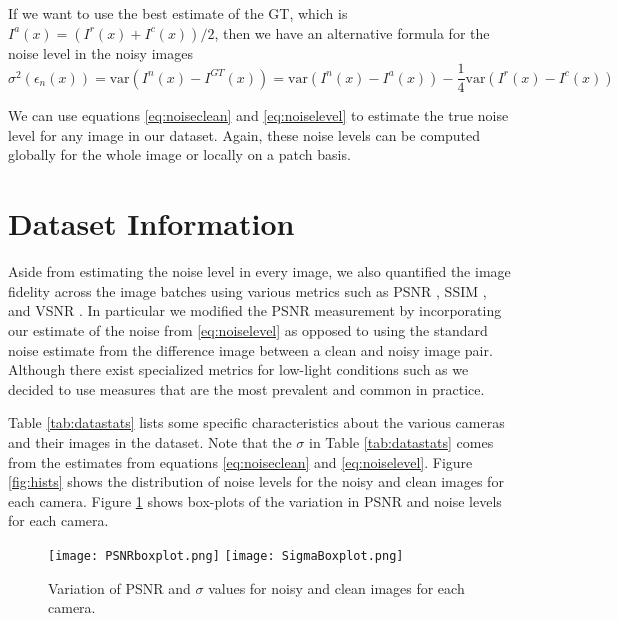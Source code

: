 \documentclass[review]{elsarticle}
\newcommand{\var}{\text{var}}
\begin{document}
If we want to use the best estimate of the GT, which is $I^a(x)=(I^r(x)+I^c(x))/2$, then we have an alternative formula for the noise level in the noisy images
\begin{equation}
\sigma^2(\epsilon_n(x))=\var(I^n(x)-I^{GT}(x))=\var(I^n(x)-I^a(x))-\frac{1}{4}\var(I^r(x)-I^c(x)) \label{eq:noiselevel1}
\end{equation}

We can use equations \eqref{eq:noiseclean} and \eqref{eq:noiselevel} to estimate the true noise level for any image in our dataset. Again, these noise levels can be computed globally for the whole image or locally on a patch basis.





\section{Dataset Information}


Aside from estimating the noise level in every image, we also quantified the image fidelity across the image batches using various metrics such as PSNR \cite{perceptualdistortion}, SSIM \cite{ssim}, and VSNR \cite{vsnr}. In particular we modified the PSNR measurement by incorporating our estimate of the noise from \eqref{eq:noiselevel} as opposed to using the standard noise estimate from the difference image between a clean and noisy image pair.  Although there exist specialized metrics for low-light conditions such as \cite{similaritylowlight} we decided to use measures that are the most prevalent and common in practice.


Table \ref{tab:datastats} lists some specific characteristics about the various cameras and their images in the dataset. Note that the $\sigma$ in Table \ref{tab:datastats} comes from the estimates from equations \eqref{eq:noiseclean} and \eqref{eq:noiselevel}. Figure \ref{fig:hists} shows the distribution of noise levels for the noisy and clean images for each camera. Figure \ref{fig:boxplots} shows box-plots of the variation in PSNR and noise levels for each camera.
\begin{figure}[t]
\vspace{-3mm}
\centering
\texttt{[image: PSNRboxplot.png]}
\texttt{[image: SigmaBoxplot.png]}
\vskip -3mm
\caption{Variation of PSNR and $\sigma$ values for noisy and clean images for each camera.}
\label{fig:boxplots}
\vspace{-5mm}
\end{figure}
\end{document}

